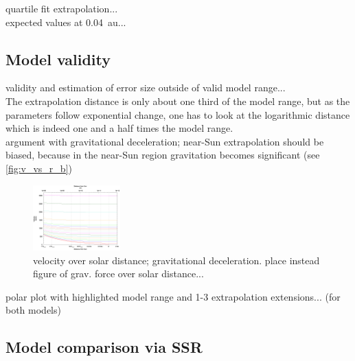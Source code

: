 quartile fit extrapolation...\\

expected values at 0.04~au...\\


\subsection{Model validity}

validity and estimation of error size outside of valid model range...\\

The extrapolation distance is only about one third of the model range, but as the parameters follow exponential change, one has to look at the logarithmic distance which is indeed one and a half times the model range.\\

argument with gravitational deceleration; near-Sun extrapolation should be biased, because in the near-Sun region gravitation becomes significant (see \autoref{fig:v_vs_r_b})\\
\begin{figure}[htb]
	\centering
	\includegraphics[width=0.3\textwidth]{images/gnuplots/v_vs_r_b.png}
	\caption{velocity over solar distance; gravitational deceleration. place instead figure of grav. force over solar distance...}
	\label{fig:v_vs_r_b}
\end{figure}

polar plot with highlighted model range and 1-3 extrapolation extensions... (for both models)\\


\subsection{Model comparison via SSR}

